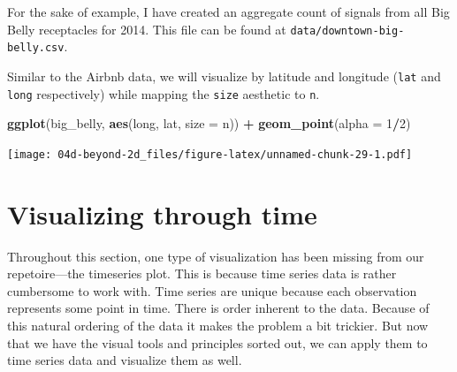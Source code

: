 \documentclass[
]{book}
\newenvironment{Shaded}{\begin{snugshade}}{\end{snugshade}}
\newcommand{\CommentTok}[1]{\textcolor[rgb]{0.56,0.35,0.01}{\textit{#1}}}
\newcommand{\DataTypeTok}[1]{\textcolor[rgb]{0.13,0.29,0.53}{#1}}
\newcommand{\DecValTok}[1]{\textcolor[rgb]{0.00,0.00,0.81}{#1}}
\newcommand{\KeywordTok}[1]{\textcolor[rgb]{0.13,0.29,0.53}{\textbf{#1}}}
\newcommand{\NormalTok}[1]{#1}
\newcommand{\OperatorTok}[1]{\textcolor[rgb]{0.81,0.36,0.00}{\textbf{#1}}}
\newcommand{\StringTok}[1]{\textcolor[rgb]{0.31,0.60,0.02}{#1}}
\begin{document}
For the sake of example, I have created an aggregate count of signals from all Big Belly receptacles for 2014. This file can be found at \texttt{data/downtown-big-belly.csv}.

\begin{Shaded}
\end{Shaded}

Similar to the Airbnb data, we will visualize by latitude and longitude (\texttt{lat} and \texttt{long} respectively) while mapping the \texttt{size} aesthetic to \texttt{n}.

\begin{Shaded}
\begin{Highlighting}[]
\KeywordTok{ggplot}\NormalTok{(big\_belly, }\KeywordTok{aes}\NormalTok{(long, lat, }\DataTypeTok{size =}\NormalTok{ n)) }\OperatorTok{+}
\StringTok{  }\KeywordTok{geom\_point}\NormalTok{(}\DataTypeTok{alpha =} \DecValTok{1}\OperatorTok{/}\DecValTok{2}\NormalTok{)}
\end{Highlighting}
\end{Shaded}

\texttt{[image: 04d-beyond-2d\_files/figure-latex/unnamed-chunk-29-1.pdf]}

\hypertarget{visualizing-through-time}{%
\chapter{Visualizing through time}\label{visualizing-through-time}}

Throughout this section, one type of visualization has been missing from our repetoire---the timeseries plot. This is because time series data is rather cumbersome to work with. Time series are unique because each observation represents some point in time. There is order inherent to the data. Because of this natural ordering of the data it makes the problem a bit trickier. But now that we have the visual tools and principles sorted out, we can apply them to time series data and visualize them as well.
\end{document}
